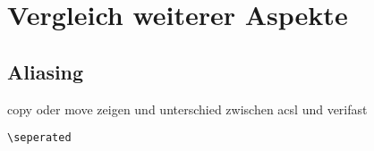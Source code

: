 ﻿\chapter{Vergleich weiterer Aspekte}


\section{Aliasing}

copy oder move zeigen und unterschied zwischen acsl und verifast

\lstinline{\seperated}

